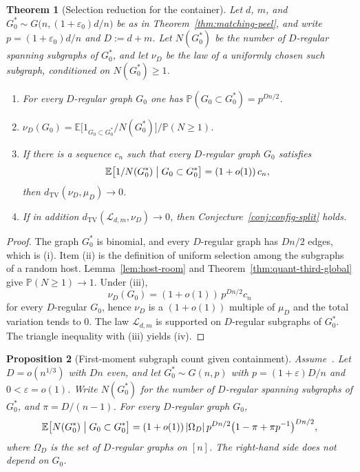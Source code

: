 \documentclass[11pt]{article}
\newtheorem{theorem}{Theorem}
\newtheorem{proposition}[theorem]{Proposition}
\newcommand{\EE}{\mathbb{E}}
\newcommand{\PP}{\mathbb{P}}
\newcommand{\dTV}{d_{\mathrm{TV}}}
\begin{document}
\begin{theorem}[Selection reduction for the container]
\label{thm:selection-reduces}
Let \(d\), \(m\), and \(G^*_0\sim G\bigl(n,(1+\varepsilon_0)d/n\bigr)\) be as in Theorem~\ref{thm:matching-peel}, and write \(p=(1+\varepsilon_0)d/n\) and \(D:=d+m\).
Let \(N(G^*_0)\) be the number of \(D\)-regular spanning subgraphs of \(G^*_0\), and let \(\nu_D\) be the law of a uniformly chosen such subgraph, conditioned on \(N(G^*_0)\ge 1\).
\begin{enumerate}
\item For every \(D\)-regular graph \(G_0\) one has \(\PP(G_0\subset G^*_0)=p^{Dn/2}\).
\item \(\nu_D(G_0)=\EE\bigl[1_{G_0\subset G^*_0}/N(G^*_0)\bigr]/\PP(N\ge 1)\).
\item If there is a sequence \(c_n\) such that every \(D\)-regular graph \(G_0\) satisfies
\[
\EE\bigl[1/N(G^*_0)\bigm|G_0\subset G^*_0\bigr]
=
(1+o(1))\,c_n,
\]
then \(\dTV(\nu_D,\mu_D)\to 0\).
\item If in addition \(\dTV(\mathcal{L}_{d,m},\nu_D)\to 0\), then Conjecture~\ref{conj:config-split} holds.
\end{enumerate}
\end{theorem}

\begin{proof}
The graph \(G^*_0\) is binomial, and every \(D\)-regular graph has \(Dn/2\) edges, which is (i).
Item (ii) is the definition of uniform selection among the subgraphs of a random host.
Lemma~\ref{lem:host-room} and Theorem~\ref{thm:quant-third-global} give \(\PP(N\ge 1)\to 1\).
Under (iii),
\[
\nu_D(G_0)
=
(1+o(1))\,p^{Dn/2}c_n
\]
for every \(D\)-regular \(G_0\), hence \(\nu_D\) is a \((1+o(1))\) multiple of \(\mu_D\) and the total variation tends to \(0\).
The law \(\mathcal{L}_{d,m}\) is supported on \(D\)-regular subgraphs of \(G^*_0\).
The triangle inequality with (iii) yields (iv).
\end{proof}

\begin{proposition}[First-moment subgraph count given containment]
\label{prop:contain-first}
Assume~\cite[Theorem~6]{Gao20}. Let \(D=o(n^{1/3})\) with \(Dn\) even, and let \(G^*_0\sim G(n,p)\) with \(p=(1+\varepsilon)D/n\) and \(0<\varepsilon=o(1)\).
Write \(N(G^*_0)\) for the number of \(D\)-regular spanning subgraphs of \(G^*_0\), and \(\pi=D/(n-1)\).
For every \(D\)-regular graph \(G_0\),
\[
\EE\bigl[N(G^*_0)\bigm|G_0\subset G^*_0\bigr]
=
(1+o(1))\,\lvert\Omega_D\rvert\,p^{Dn/2}\bigl(1-\pi+\pi p^{-1}\bigr)^{Dn/2},
\]
where \(\Omega_D\) is the set of \(D\)-regular graphs on \([n]\).
The right-hand side does not depend on \(G_0\).
\end{proposition}
\end{document}
